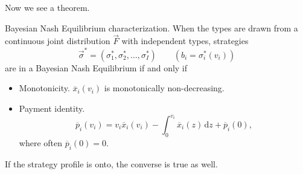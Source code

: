 Now we see a theorem.
\begin{theorem}
	Bayesian Nash Equilibrium characterization. When the types are drawn from a continuous joint distribution \(\vec{F}\) with independent types,
	strategies
	\[
		\vec{\sigma}^{*} = (\sigma^{*}_1, \sigma^{*}_2, \ldots , \sigma^{*}_I)\qquad (b_{i} = \sigma^{*}_{i}(v_{i}))
	\]
	are in a Bayesian Nash Equilibrium if and only if
	\begin{itemize}
		\item Monotonicity. \(\overline{x}_{i}(v_{i})\) is monotonically non-decreasing.
		\item Payment identity.
		      \[
			      \overline{p}_{i}(v_{i}) = v_{i}\overline{x}_{i}(v_{i}) - \int_0^{v_{i}} \overline{x}_{i}(z)\,\mathrm{d}z + \overline{p}_{i}(0),
		      \]
		      where often \(\overline{p}_{i}(0) = 0\).
	\end{itemize}
	If the strategy profile is onto, the converse is true as well.
\end{theorem}